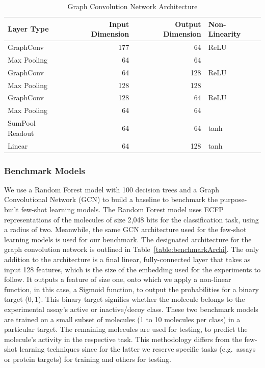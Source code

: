\begin{table}
    \centering
    \begin{tabular}{@{}lrrl@{}}
    \hline
    \textbf{Layer Type} & \textbf{Input Dimension} & \textbf{Output Dimension} & \textbf{Non-Linearity} \\
    \hline
    GraphConv & 177 & 64 & ReLU \\
    Max Pooling & 64 & 64 & \\
    GraphConv & 64 & 128 & ReLU \\
    Max Pooling & 128 & 128 & \\
    GraphConv & 128 & 64 & ReLU \\
    Max Pooling & 64 & 64 & \\
    SumPool Readout & 64 & 64 & tanh \\
    Linear & 64 & 128 & tanh \\
    \hline  
    \end{tabular}
    \caption{Graph Convolution Network Architecture}
    \label{table:gcn-architecture}
\end{table}

\subsubsection{Benchmark Models}

We use a Random Forest model with 100 decision trees and a Graph Convolutional Network (GCN) to build a baseline to benchmark the purpose-built few-shot learning models. The Random Forest model uses ECFP representations of the molecules of size 2,048 bits for the classification task, using a radius of two. Meanwhile, the same GCN architecture used for the few-shot learning models is used for our benchmark. The designated architecture for the graph convolution network is outlined in Table~\ref{table:benchmarkArchi}. The only addition to the architecture is a final linear, fully-connected layer that takes as input 128 features, which is the size of the embedding used for the experiments to follow. It outputs a feature of size one, onto which we apply a non-linear function, in this case, a Sigmoid function, to output the probabilities for a binary target (${0, 1}$). This binary target signifies whether the molecule belongs to the experimental assay's active or inactive/decoy class. These two benchmark models are trained on a small subset of molecules (1 to 10 molecules per class) in a particular target. The remaining molecules are used for testing, to predict the molecule's activity in the respective task. This methodology differs from the few-shot learning techniques since for the latter we reserve specific tasks (e.g.\ assays or protein targets) for training and others for testing. 

